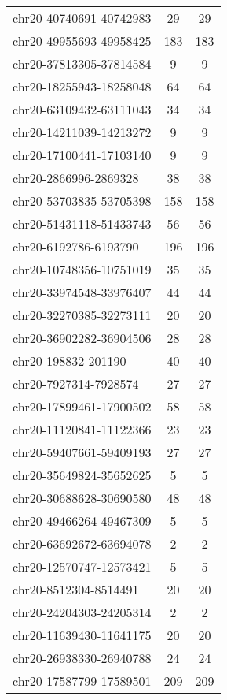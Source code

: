 \documentclass[10pt,letterpaper]{article}
\begin{document}
{\begin{longtable}{lSS}
	chr20-40740691-40742983 & 29     & 29       \\
	chr20-49955693-49958425 & 183    & 183      \\
	chr20-37813305-37814584 & 9      & 9        \\
	chr20-18255943-18258048 & 64     & 64       \\
	chr20-63109432-63111043 & 34     & 34       \\
	chr20-14211039-14213272 & 9      & 9        \\
	chr20-17100441-17103140 & 9      & 9        \\
	chr20-2866996-2869328   & 38     & 38       \\
	chr20-53703835-53705398 & 158    & 158      \\
	chr20-51431118-51433743 & 56     & 56       \\
	chr20-6192786-6193790   & 196    & 196      \\
	chr20-10748356-10751019 & 35     & 35       \\
	chr20-33974548-33976407 & 44     & 44       \\
	chr20-32270385-32273111 & 20     & 20       \\
	chr20-36902282-36904506 & 28     & 28       \\
	chr20-198832-201190     & 40     & 40       \\
	chr20-7927314-7928574   & 27     & 27       \\
	chr20-17899461-17900502 & 58     & 58       \\
	chr20-11120841-11122366 & 23     & 23       \\
	chr20-59407661-59409193 & 27     & 27       \\
	chr20-35649824-35652625 & 5      & 5        \\
	chr20-30688628-30690580 & 48     & 48       \\
	chr20-49466264-49467309 & 5      & 5        \\
	chr20-63692672-63694078 & 2      & 2        \\
	chr20-12570747-12573421 & 5      & 5        \\
	chr20-8512304-8514491   & 20     & 20       \\
	chr20-24204303-24205314 & 2      & 2        \\
	chr20-11639430-11641175 & 20     & 20       \\
	chr20-26938330-26940788 & 24     & 24       \\
	chr20-17587799-17589501 & 209    & 209      \\

\end{longtable}}
\end{document}
